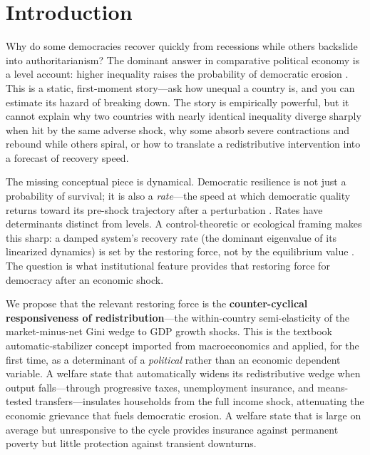 \documentclass[11pt,letterpaper]{article}
\begin{document}
\section{Introduction}

Why do some democracies recover quickly from recessions while others backslide into authoritarianism? The dominant answer in comparative political economy is a level account: higher inequality raises the probability of democratic erosion \citep{Rau2025, Acemoglu2006}. This is a static, first-moment story---ask how unequal a country is, and you can estimate its hazard of breaking down. The story is empirically powerful, but it cannot explain why two countries with nearly identical inequality diverge sharply when hit by the same adverse shock, why some absorb severe contractions and rebound while others spiral, or how to translate a redistributive intervention into a forecast of recovery speed.

The missing conceptual piece is dynamical. Democratic resilience is not just a probability of survival; it is also a \emph{rate}---the speed at which democratic quality returns toward its pre-shock trajectory after a perturbation \citep{Riedl2024}. Rates have determinants distinct from levels. A control-theoretic or ecological framing makes this sharp: a damped system's recovery rate (the dominant eigenvalue of its linearized dynamics) is set by the restoring force, not by the equilibrium value \citep{Holling1973}. The question is what institutional feature provides that restoring force for democracy after an economic shock.

We propose that the relevant restoring force is the \textbf{counter-cyclical responsiveness of redistribution}---the within-country semi-elasticity of the market-minus-net Gini wedge to GDP growth shocks. This is the textbook automatic-stabilizer concept \citep{McKay2016} imported from macroeconomics and applied, for the first time, as a determinant of a \emph{political} rather than an economic dependent variable. A welfare state that automatically widens its redistributive wedge when output falls---through progressive taxes, unemployment insurance, and means-tested transfers---insulates households from the full income shock, attenuating the economic grievance that fuels democratic erosion. A welfare state that is large on average but unresponsive to the cycle provides insurance against permanent poverty but little protection against transient downturns.
\end{document}

